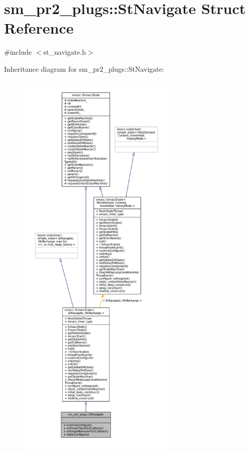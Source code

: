 \hypertarget{structsm__pr2__plugs_1_1StNavigate}{}\section{sm\+\_\+pr2\+\_\+plugs\+:\+:St\+Navigate Struct Reference}
\label{structsm__pr2__plugs_1_1StNavigate}


{\ttfamily \#include $<$st\+\_\+navigate.\+h$>$}



Inheritance diagram for sm\+\_\+pr2\+\_\+plugs\+:\+:St\+Navigate\+:
\nopagebreak
\begin{figure}[H]
\begin{center}
\leavevmode
\includegraphics[height=550pt]{structsm__pr2__plugs_1_1StNavigate__inherit__graph}
\end{center}
\end{figure}


